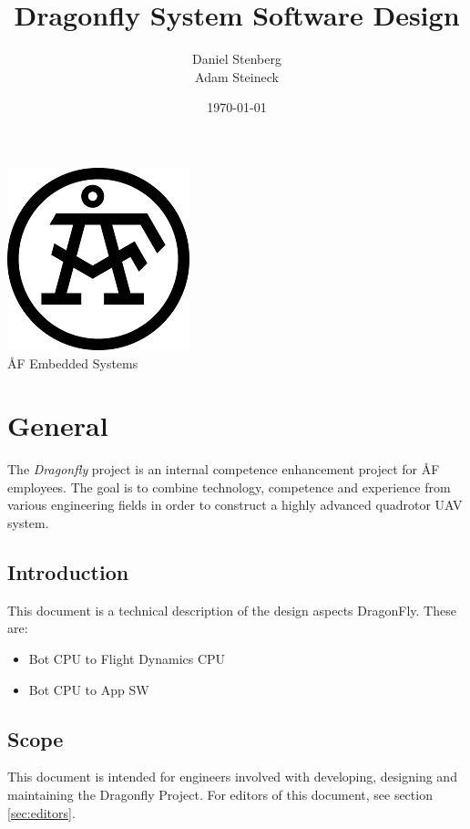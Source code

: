 \documentclass[a4paper]{article}
\title{Dragonfly System Software Design}
\author{Daniel Stenberg \\ Adam Steineck}
\date{\today}         		%
\begin{document}

\maketitle                      		%

\begin{center}
\vspace{64pt}
\includegraphics[scale=1.6]{images/AF_Logotype20141_Black.png}
\vspace{16pt}
\\ \large ÅF Embedded Systems
\end{center}

\newpage

\tableofcontents				%

\newpage

\section{General}

The \emph{Dragonfly} project is an internal competence enhancement project for ÅF employees. The goal is to combine technology, competence and experience from various engineering fields in order to construct a highly advanced quadrotor UAV system.

\subsection{Introduction}
This document is a technical description of the design aspects DragonFly. These are:
\begin{itemize}
\item Bot CPU to Flight Dynamics CPU
\item Bot CPU to App SW
\end{itemize}

\subsection{Scope}
This document is intended for engineers involved with developing, designing and maintaining the Dragonfly Project. For editors of this document, see section \ref{sec:editors}.
\end{document}
